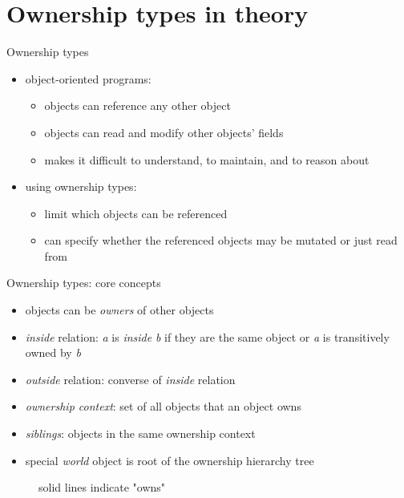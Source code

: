 \documentclass{beamer}
\begin{document}
\section{Ownership types in theory}

\begin{frame}{Ownership types}
\begin{itemize}
  \item object-oriented programs:
  \begin{itemize}
    \item objects can reference any other object
    \item objects can read and modify other objects' fields
    \item makes it difficult to understand, to maintain, and to reason about
  \end{itemize}
  \item using ownership types:
  \begin{itemize}
    \item limit which objects can be referenced
    \item can specify whether the referenced objects may be mutated or just read from
  \end{itemize}
\end{itemize}
\end{frame}


\begin{frame}{Ownership types: core concepts}
\begin{itemize}
  \item objects can be \emph{owners} of other objects
  \item \emph{inside} relation: \emph{a} is \emph{inside} \emph{b} if they are the same object or \emph{a} is transitively owned by \emph{b}
  \item \emph{outside} relation: converse of \emph{inside} relation
  \item \emph{ownership context}: set of all objects that an object owns
  \item \emph{siblings}: objects in the same ownership context
  \item special \emph{world} object is root of the ownership hierarchy tree
\end{itemize}

\begin{figure}[fragile]

  \caption{solid lines indicate "owns"}
\end{figure}
\end{frame}
\end{document}
